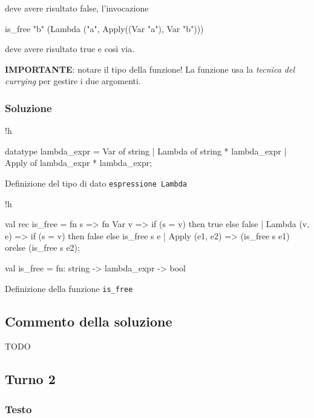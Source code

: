 deve avere risultato false, l'invocazione

\begin{smlcode}
is_free "b" (Lambda ("a", Apply((Var "a"), Var "b")))
\end{smlcode}

deve avere risultato true e così via.

\medskip
\textbf{IMPORTANTE}: notare il tipo della funzione! La funzione usa la \emph{tecnica del currying} per gestire i due argomenti.

\subsubsection{Soluzione}

\begin{listing}{!h}
\begin{smlcode}
datatype lambda_expr = Var of string
					 | Lambda of string * lambda_expr
					 | Apply of lambda_expr * lambda_expr;
\end{smlcode}
\caption[]{Definizione del tipo di dato \texttt{espressione Lambda}}
\end{listing}

\begin{listing}{!h}
\begin{smlcode}
val rec is_free = fn s => fn Var v => if (s = v) then
									      true
									  else
									      false
				| Lambda (v, e) => if (s = v) then
									   false
								   else
									   is_free s e
				| Apply (e1, e2) => (is_free s e1) orelse (is_free s e2);

val is_free = fn: string -> lambda_expr -> bool
\end{smlcode}
\caption{Definizione della funzione \texttt{is_free}}
\end{listing}

\subsection{Commento della soluzione}

TODO

\subsection{Turno 2}

\subsubsection{Testo}


